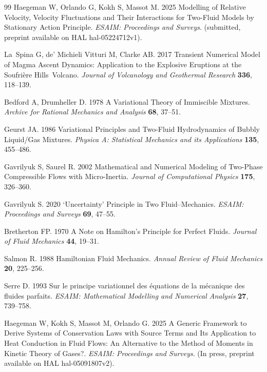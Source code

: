 \documentclass{myclass}
\begin{document}
\begin{thebibliography}{99}
Haegeman W, Orlando G, Kokh S, Massot M. 2025  Modelling of Relative Velocity,
  Velocity Fluctuations and Their Interactions for Two-Fluid Models by
  {{Stationary Action Principle}}. {\em ESAIM: Proceedings and Surveys}.
(submitted, preprint available on HAL hal-05224712v1).

La~Spina G, {de' Michieli Vitturi} M, Clarke AB. 2017  Transient Numerical
  Model of Magma Ascent Dynamics: Application to the Explosive Eruptions at the
  {{Soufri{\`e}re Hills~Volcano}}. {\em Journal of Volcanology and Geothermal
  Research} \textbf{336}, 118--139.

Bedford A, Drumheller D. 1978  A Variational Theory of Immiscible Mixtures.
  {\em Archive for Rational Mechanics and Analysis} \textbf{68}, 37--51.

Geurst JA. 1986  Variational Principles and Two-Fluid Hydrodynamics of Bubbly
  Liquid/Gas Mixtures. {\em Physica A: Statistical Mechanics and its
  Applications} \textbf{135}, 455--486.

Gavrilyuk S, Saurel R. 2002  Mathematical and {{Numerical Modeling}} of
  {{Two-Phase Compressible Flows}} with {{Micro-Inertia}}. {\em Journal of
  Computational Physics} \textbf{175}, 326--360.

Gavrilyuk S. 2020  `{{Uncertainty}}' Principle in Two Fluid--Mechanics. {\em
  ESAIM: Proceedings and Surveys} \textbf{69}, 47--55.

Bretherton FP. 1970  A Note on {{Hamilton}}'s Principle for Perfect Fluids.
  {\em Journal of Fluid Mechanics} \textbf{44}, 19--31.

Salmon R. 1988  Hamiltonian {{Fluid Mechanics}}. {\em Annual Review of Fluid
  Mechanics} \textbf{20}, 225--256.

Serre D. 1993  {Sur le principe variationnel des {\'e}quations de la
  m{\'e}canique des fluides parfaits}. {\em ESAIM: Mathematical Modelling and
  Numerical Analysis} \textbf{27}, 739--758.

Haegeman W, Kokh S, Massot M, Orlando G. 2025  A Generic Framework to Derive
  Systems of Conservation Laws with Source Terms and Its Application to Heat
  Conduction in Fluid Flows: An Alternative to the Method of Moments in Kinetic
  Theory of Gases?. {\em ESAIM: Proceedings and Surveys}.
(In press, preprint available on HAL hal-05091807v2).


\end{thebibliography}
\end{document}
